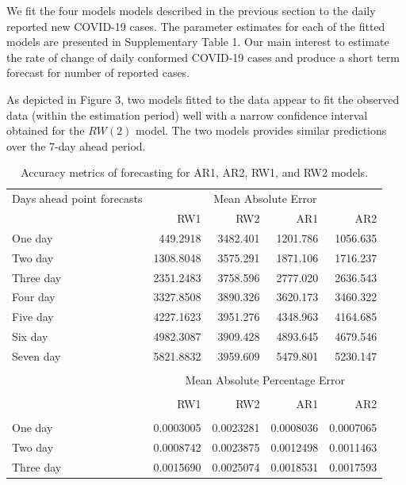 \documentclass[10pt,letterpaper]{article}
\begin{document}
We fit the four models models described in the previous section to the daily
reported new COVID-19 cases. The parameter estimates for each of the fitted models
are presented in Supplementary Table 1. Our main interest to estimate the rate of change of daily conformed COVID-19 cases and produce a short term forecast for number of reported cases.  

As depicted in Figure 3, two
models fitted to the data appear to fit the observed data (within the
estimation period) well with a narrow confidence interval obtained for
the \(RW(2)\) model. The two models provides similar predictions over
the 7-day ahead period.



\begin{table}[!h]
	
	\caption{\label{tab:Accuracy}Accuracy metrics of forecasting for AR1, AR2, RW1, and RW2 models.}
	\centering
	\begin{tabular}[t]{lrrrr}
		\hline
		Days ahead point forecasts & \multicolumn{4}{c}{Mean Absolute Error}\\
		\cline{2-5}
		& RW1 & RW2 & AR1 & AR2\\
		\hline
		One day & 449.2918 & 3482.401 & 1201.786 & 1056.635\\
		\hline
		Two day & 1308.8048 & 3575.291 & 1871.106 & 1716.237\\
		\hline
		Three day & 2351.2483 & 3758.596 & 2777.020 & 2636.543\\
		\hline
		Four day & 3327.8508 & 3890.326 & 3620.173 & 3460.322\\
		\hline
		Five day & 4227.1623 & 3951.276 & 4348.963 & 4164.685\\
		\hline
		Six day & 4982.3087 & 3909.428 & 4893.645 & 4679.546\\
		\hline
		Seven day & 5821.8832 & 3959.609 & 5479.801 & 5230.147\\
		\hline\\
		& \multicolumn{4}{c}{Mean Absolute Percentage Error}\\
		\cline{2-5}\\
		& RW1 & RW2 & AR1 & AR2\\
		\hline\\
		One day & 0.0003005 & 0.0023281 & 0.0008036 & 0.0007065\\
		\hline
		Two day & 0.0008742 & 0.0023875 & 0.0012498 & 0.0011463\\
		\hline
		Three day & 0.0015690 & 0.0025074 & 0.0018531 & 0.0017593\\

\end{tabular}
\end{table}
\end{document}
